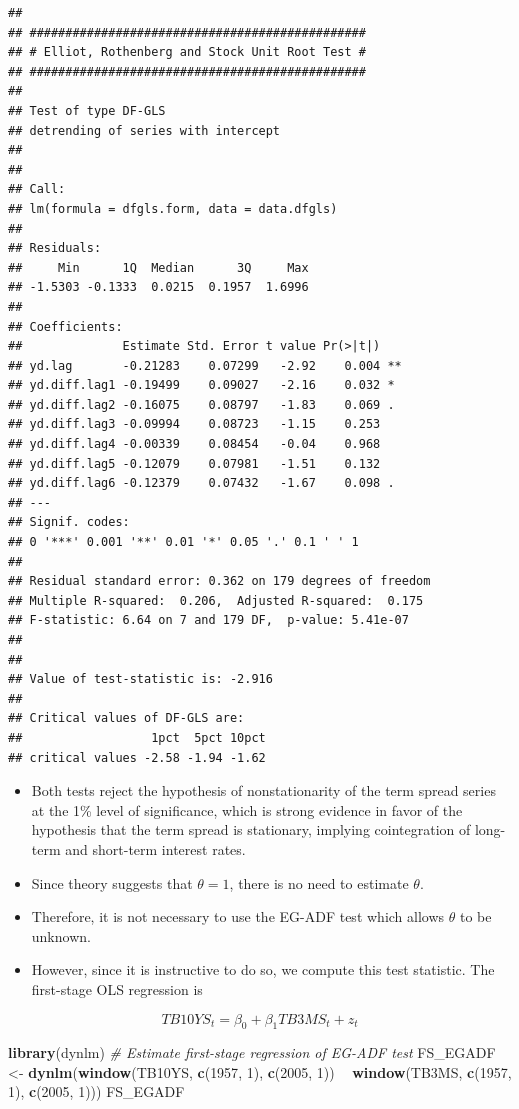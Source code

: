 \documentclass[]{book}
\newenvironment{Shaded}{\begin{snugshade}}{\end{snugshade}}
\newcommand{\CommentTok}[1]{\textcolor[rgb]{0.56,0.35,0.01}{\textit{#1}}}
\newcommand{\DecValTok}[1]{\textcolor[rgb]{0.00,0.00,0.81}{#1}}
\newcommand{\KeywordTok}[1]{\textcolor[rgb]{0.13,0.29,0.53}{\textbf{#1}}}
\newcommand{\NormalTok}[1]{#1}
\newcommand{\OperatorTok}[1]{\textcolor[rgb]{0.81,0.36,0.00}{\textbf{#1}}}
\newcommand{\StringTok}[1]{\textcolor[rgb]{0.31,0.60,0.02}{#1}}
\providecommand{\tightlist}{%
  \setlength{\itemsep}{0pt}\setlength{\parskip}{0pt}}
\begin{document}
\begin{verbatim}
## 
## ############################################### 
## # Elliot, Rothenberg and Stock Unit Root Test # 
## ############################################### 
## 
## Test of type DF-GLS 
## detrending of series with intercept 
## 
## 
## Call:
## lm(formula = dfgls.form, data = data.dfgls)
## 
## Residuals:
##     Min      1Q  Median      3Q     Max 
## -1.5303 -0.1333  0.0215  0.1957  1.6996 
## 
## Coefficients:
##              Estimate Std. Error t value Pr(>|t|)   
## yd.lag       -0.21283    0.07299   -2.92    0.004 **
## yd.diff.lag1 -0.19499    0.09027   -2.16    0.032 * 
## yd.diff.lag2 -0.16075    0.08797   -1.83    0.069 . 
## yd.diff.lag3 -0.09994    0.08723   -1.15    0.253   
## yd.diff.lag4 -0.00339    0.08454   -0.04    0.968   
## yd.diff.lag5 -0.12079    0.07981   -1.51    0.132   
## yd.diff.lag6 -0.12379    0.07432   -1.67    0.098 . 
## ---
## Signif. codes:  
## 0 '***' 0.001 '**' 0.01 '*' 0.05 '.' 0.1 ' ' 1
## 
## Residual standard error: 0.362 on 179 degrees of freedom
## Multiple R-squared:  0.206,  Adjusted R-squared:  0.175 
## F-statistic: 6.64 on 7 and 179 DF,  p-value: 5.41e-07
## 
## 
## Value of test-statistic is: -2.916 
## 
## Critical values of DF-GLS are:
##                  1pct  5pct 10pct
## critical values -2.58 -1.94 -1.62
\end{verbatim}

\begin{itemize}
\tightlist
\item
  Both tests reject the hypothesis of nonstationarity of the term spread series at the 1\% level of significance, which is strong evidence in favor of the hypothesis that the term spread is stationary, implying cointegration of long-term and short-term interest rates.
\item
  Since theory suggests that \(\theta = 1\), there is no need to estimate \(\theta\).
\item
  Therefore, it is not necessary to use the EG-ADF test which allows \(\theta\) to be unknown.
\item
  However, since it is instructive to do so, we compute this test statistic. The first-stage OLS regression is
\end{itemize}

\[TB10YS_t = \beta_0 + \beta_1 TB3MS_t + z_t\]

\begin{Shaded}
\begin{Highlighting}[]
\KeywordTok{library}\NormalTok{(dynlm)}
\CommentTok{# Estimate first-stage regression of EG-ADF test}
\NormalTok{FS_EGADF <-}\StringTok{ }\KeywordTok{dynlm}\NormalTok{(}\KeywordTok{window}\NormalTok{(TB10YS, }\KeywordTok{c}\NormalTok{(}\DecValTok{1957}\NormalTok{, }\DecValTok{1}\NormalTok{), }\KeywordTok{c}\NormalTok{(}\DecValTok{2005}\NormalTok{, }\DecValTok{1}\NormalTok{)) }\OperatorTok{~}
\KeywordTok{window}\NormalTok{(TB3MS, }\KeywordTok{c}\NormalTok{(}\DecValTok{1957}\NormalTok{, }\DecValTok{1}\NormalTok{), }\KeywordTok{c}\NormalTok{(}\DecValTok{2005}\NormalTok{, }\DecValTok{1}\NormalTok{)))}
\NormalTok{FS_EGADF}
\end{Highlighting}
\end{Shaded}
\end{document}
